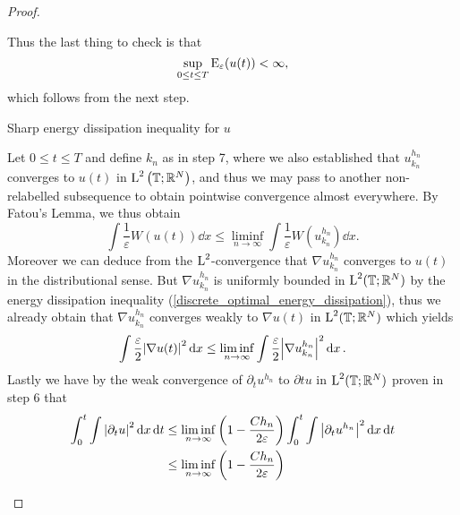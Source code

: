 \begin{proof}
\begin{description}[wide=0pt]
	Thus the last thing to check is that
	\begin{equation*}
		\sup_{ 0 \leq t \leq T }
			\operatorname{E}_{ \varepsilon } ( u( t ) )
		<
		\infty,
	\end{equation*}
	which follows from the next step.
	
	\item[Step 8:] Sharp energy dissipation inequality for $ u $
	
	Let $ 0 \leq t \leq T $ and define $ k_{ n } $ as in step 7, where we also established that $ u_{ k_{ n } }^{ h_{ n } } $ converges to $ u ( t ) $ in $ \operatorname{L}^{ 2 } \left( \operatorname{\mathbb{T}} ; \mathbb{ R }^{ N } \right) $, and thus we may pass to another non-relabelled subsequence to obtain pointwise convergence almost everywhere. By Fatou's Lemma, we thus obtain
	\begin{equation*}
		\int
			\frac{ 1 }{ \varepsilon }
			W ( u ( t ) ) 
		\dd{ x }
		\leq
		\liminf_{ n \to \infty }
			\int
				\frac{ 1 }{ \varepsilon }
				W ( u_{ k_{ n } }^{ h_{ n } } )
			\dd{ x }.
	\end{equation*}
	Moreover we can deduce from the $ \operatorname{L}^{ 2 } $-convergence that $ \nabla u_{ k_{ n } }^{ h_{ n } } $ converges to $ u( t ) $ in the distributional sense. But $ \nabla u_{ k_{ n } }^{ h_{ n } } $ is uniformly bounded in $ \operatorname{L}^{ 2 } ( \operatorname{\mathbb{T}} ; \mathbb{ R }^{ N } ) $ by the energy dissipation inequality (\ref{discrete_optimal_energy_dissipation}), thus we already obtain that $ \nabla u_{ k_{ n } }^{ h_{ n } } $ converges weakly to $ \nabla u ( t ) $ in $ \operatorname{L}^{ 2 } ( \operatorname{\mathbb{T}}; \mathbb{ R }^{ N } ) $ which yields
	\begin{equation*}
		\int 
			\frac{ \varepsilon }{ 2 }
			\abs{ \nabla u ( t ) }^{ 2 }
		\dd{ x }
		\leq
		\liminf_{ n \to \infty }
			\int
				\frac{ \varepsilon }{ 2 }
				\abs{ \nabla u_{ k_{ n } }^{ h_{ n } } }^{ 2 }
			\dd{ x }.
	\end{equation*}
	Lastly we have by the weak convergence of $ \partial_{ t } u^{ h_{n } } $ to $ \partial{ t} u $ in $\operatorname{L}^{ 2 } ( \operatorname{\mathbb{T}} ; \mathbb{ R }^{ N } ) $ proven in step 6 that
	\begin{align*}
		\int_{ 0 }^{ t }
			\int
				\abs{ \partial_{ t } u }^{ 2 }
			\dd{ x }
		\dd{ t }
		& \leq
		\liminf_{ n \to \infty }
			\left( 1 - \frac{ C h_{ n } }{ 2 \varepsilon } \right)
			\int_{ 0 }^{ t }
				\int
					\abs{ \partial_{ t } u^{ h_{ n } } }^{ 2 }
				\dd{ x }
			\dd{ t }
		\\
		& \leq
		\liminf_{ n \to \infty }
			\left( 1 - \frac{ C h_{ n } }{ 2 \varepsilon } \right)

\end{align*}
\end{description}
\end{proof}
